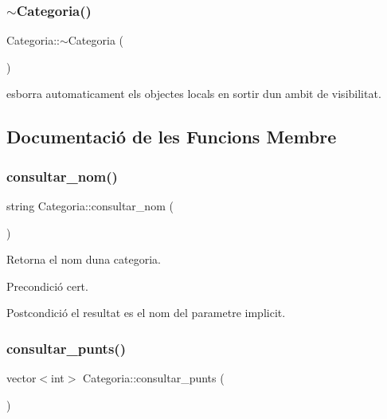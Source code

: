\subsubsection{\texorpdfstring{$\sim$\+Categoria()}{~Categoria()}}
{\footnotesize\ttfamily Categoria\+::$\sim$\+Categoria (\begin{DoxyParamCaption}{ }\end{DoxyParamCaption})}



esborra automaticament els objectes locals en sortir d\textquotesingle{}un ambit de visibilitat. 



\subsection{Documentació de les Funcions Membre}
\mbox{\label{class_categoria_a99e68d77bab3b652aee54ba09e302238}} 
\subsubsection{\texorpdfstring{consultar\+\_\+nom()}{consultar\_nom()}}
{\footnotesize\ttfamily string Categoria\+::consultar\+\_\+nom (\begin{DoxyParamCaption}{ }\end{DoxyParamCaption})}



Retorna el nom d\textquotesingle{}una categoria. 

\begin{DoxyPrecond}{Precondició}
cert. 
\end{DoxyPrecond}
\begin{DoxyPostcond}{Postcondició}
el resultat es el nom del parametre implicit. 
\end{DoxyPostcond}
\mbox{\label{class_categoria_a67d5c6d5efb82b9b173079bb01f0ca24}} 
\subsubsection{\texorpdfstring{consultar\+\_\+punts()}{consultar\_punts()}}
{\footnotesize\ttfamily vector$<$int$>$ Categoria\+::consultar\+\_\+punts (\begin{DoxyParamCaption}{ }\end{DoxyParamCaption})}



